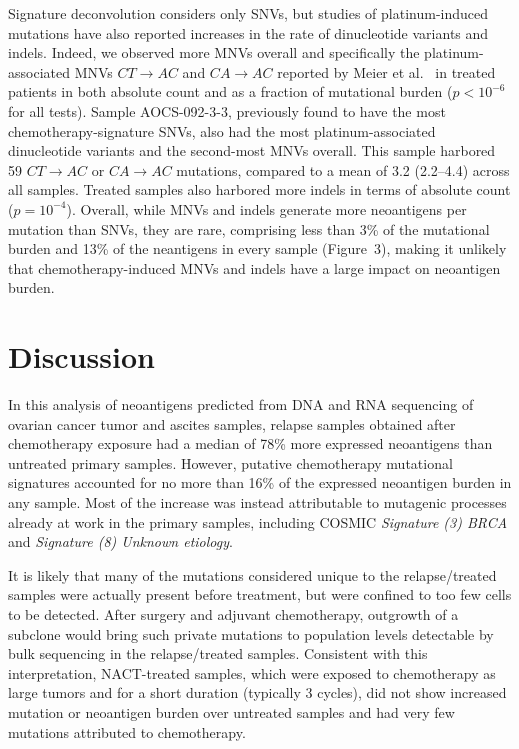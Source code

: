 \documentclass{bmcart}
\begin{document}
Signature deconvolution considers only SNVs, but studies of platinum-induced mutations have also reported increases in the rate of dinucleotide variants and indels. Indeed, we observed more MNVs overall and specifically the platinum-associated MNVs $CT \rightarrow AC$ and $CA \rightarrow AC$ reported by Meier et al.~\cite{Meier_2014} in treated patients in both absolute count and as a fraction of mutational burden ($p < 10^{-6}$ for all tests). Sample AOCS-092-3-3, previously found to have the most chemotherapy-signature SNVs, also had the most platinum-associated dinucleotide variants and the second-most MNVs overall. This sample harbored 59 $CT \rightarrow AC$ or $CA \rightarrow AC$ mutations, compared to a mean of 3.2 (2.2--4.4) across all samples. Treated samples also harbored more indels in terms of absolute count ($p=10^{-4}$). Overall, while MNVs and indels generate more neoantigens per mutation than SNVs, they are rare, comprising less than 3\% of the mutational burden and 13\% of the neantigens in every sample (Figure~3), making it unlikely that chemotherapy-induced MNVs and indels have a large impact on neoantigen burden.


\section*{Discussion}
In this analysis of neoantigens predicted from DNA and RNA sequencing of ovarian cancer tumor and ascites samples, relapse samples obtained after chemotherapy exposure had a median of 78\% more expressed neoantigens than untreated primary samples. However, putative chemotherapy mutational signatures accounted for no more than 16\% of the expressed neoantigen burden in any sample. Most of the increase was instead attributable to mutagenic processes already at work in the primary samples, including COSMIC \textit{Signature (3) BRCA} and \textit{Signature (8) Unknown etiology}. 

It is likely that many of the mutations considered unique to the relapse/treated samples were actually present before treatment, but were confined to too few cells to be detected. After surgery and adjuvant chemotherapy, outgrowth of a subclone would bring such private mutations to population levels detectable by bulk sequencing in the relapse/treated samples. Consistent with this interpretation, NACT-treated samples, which were exposed to chemotherapy as large tumors and for a short duration (typically 3 cycles), did not show increased mutation or neoantigen burden over untreated samples and had very few mutations attributed to chemotherapy.
\end{document}
